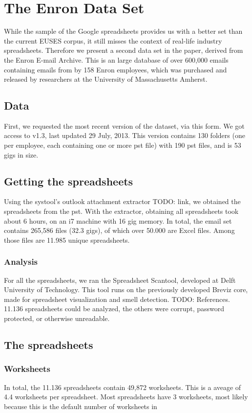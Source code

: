 \documentclass{sig-alternate} %
\begin{document}
\section{The Enron Data Set}

While the sample of the Google spreadsheets provides us with a better set than the current EUSES corpus, it still misses the context of real-life industry spreadsheets. Therefore we present a second data set in the paper, derived from the Enron E-mail Archive. This is an large database of over 600,000 emails containing emails from by 158 Enron employees, which was purchased and released by researchers at the University of Massachusetts Amherst. 

\subsection{Data}
First, we requested the most recent version of the dataset, via this form. We got access to v1.3, last updated 29 July, 2013. This version contains 130 folders (one per employee, each containing one or more pst file) with 190 pst files, and is 53 gigs in size.

\subsection{Getting the spreadsheets}
Using the systool's outlook attachment extractor TODO: link, we obtained the spreadsheets from the pst. With the extractor, obtaining all spreadsheets took about 6 hours, on an i7 machine with 16 gig memory. In total, the email set contains 265,586 files (32.3 gigs), of which over 50.000 are Excel files. Among those files are 11.985 unique spreadsheets.

\subsubsection{Analysis}
For all the spreadsheets, we ran the Spreadsheet Scantool, developed at Delft University of Technology. This tool runs on the previously developed Breviz core, made for spreadsheet visualization and smell detection. TODO: References. 11.136 spreadsheets could be analyzed, the others were corrupt, password protected, or otherwise unreadable.

\subsection{The spreadsheets}
\subsubsection{Worksheets}
In total, the 11.136 spreadsheets contain 49,872 worksheets. This is a aveage of 4.4 worksheets per spreadsheet. Most spreadsheets have 3 worksheets, most likely because this is the default number of worksheets in 
\end{document}
